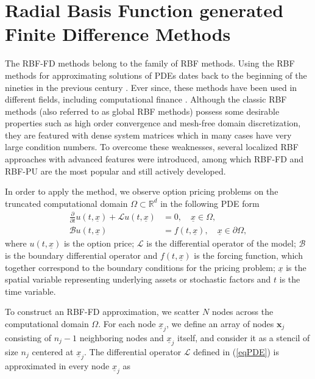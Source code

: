 \documentclass{UUThesisTemplate}
\begin{document}
\chapter{Radial Basis Function generated Finite Difference Methods}
\label{ch:rbffd}
The RBF-FD methods belong to the family of RBF methods. Using the RBF methods for approximating solutions of PDEs dates back to the beginning of the nineties in the previous century \cite{kansa1990multiquadrics2, kansa1990multiquadrics1}. Ever since, these methods have been used in different fields, including computational finance \cite{fasshauer2004using, hon1999radial, pettersson2008improved}. Although the classic RBF methods (also referred to as global RBF methods) possess some desirable properties such as high order convergence and mesh-free domain discretization, they are featured with dense system matrices which in many cases have very large condition numbers. To overcome these weaknesses, several localized RBF approaches with advanced features were introduced, among which RBF-FD \cite{tolstykh2000using, wright2006scattered} and RBF-PU \cite{wendland2002fast} are the most popular and still actively developed.
\par
In order to apply the method, we observe option pricing problems on the truncated computational domain $\Omega\subset \mathbb{R}^{d}$ in the following PDE form
\begin{align}
\frac{\partial}{\partial t}u(t,\underline{x}) + \mathcal{L}u(t,\underline{x}) &= 0, \quad \underline{x} \in \Omega, \label{eqPDE} \\
\mathcal{B}u(t,\underline{x}) &= f(t,\underline{x}), \quad \underline{x} \in \partial \Omega, \label{eqBC}
\end{align}
where $u(t,\underline{x})$ is the option price; $\mathcal{L}$ is the differential operator of the model; $\mathcal{B}$ is the boundary differential operator and $f(t,\underline{x})$ is the forcing function, which together correspond to the boundary conditions for the pricing problem; $\underline{x}$ is the spatial variable representing underlying assets or stochastic factors and $t$ is the time variable.
\par
To construct an RBF-FD approximation, we scatter $N$ nodes across the computational domain $\Omega$. For each node $\underline{x}_j$, we define an array of nodes $\mathbf{x}_j$ consisting of $n_j-1$ neighboring nodes and $\underline{x}_j$ itself, and consider it as a stencil of size $n_j$ centered at $\underline{x}_j$. The differential operator $\mathcal{L}$ defined in (\ref{eqPDE})  is approximated in every node  $\underline{x}_j$ as
\end{document}
